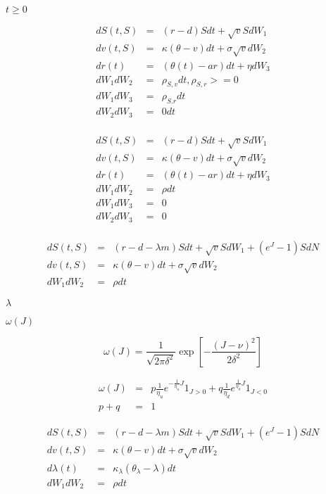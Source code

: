 \documentclass{article}
\begin{document}
$ t \geq 0 $
\pagebreak

\[\begin{array}{rcl}
dS(t, S)  &=& (r-d) S dt +\sqrt{v} S dW_1 \\
dv(t, S)  &=& \kappa (\theta - v) dt + \sigma \sqrt{v} dW_2 \\
dr(t)     &=& (\theta(t) - a r) dt + \eta dW_3 \\
dW_1 dW_2 &=& \rho_{S,v} dt, \rho_{S,r} >= 0 \\
dW_1 dW_3 &=& \rho_{S.r} dt \\
dW_2 dW_3 &=& 0 dt \\
\end{array}
\]
\pagebreak

\[\begin{array}{rcl}
dS(t, S)  &=& (r-d) S dt +\sqrt{v} S dW_1 \\
dv(t, S)  &=& \kappa (\theta - v) dt + \sigma \sqrt{v} dW_2 \\
dr(t)     &=& (\theta(t) - a r) dt + \eta dW_3 \\
dW_1 dW_2 &=& \rho dt \\
dW_1 dW_3 &=& 0 \\
dW_2 dW_3 &=& 0 \\
\end{array}
\]
\pagebreak

\[\begin{array}{rcl}
dS(t, S)  &=& (r-d-\lambda m) S dt +\sqrt{v} S dW_1 + (e^J - 1) S dN \\
dv(t, S)  &=& \kappa (\theta - v) dt + \sigma \sqrt{v} dW_2 \\
dW_1 dW_2 &=& \rho dt
\end{array}
\]
\pagebreak

$ \lambda
$
\pagebreak

$ \omega(J) $
\pagebreak

\[\omega(J) = \frac{1}{\sqrt{2\pi \delta^2}}
            \exp\left[-\frac{(J-\nu)^2}{2\delta^2}\right]
\]
\pagebreak

\[\begin{array}{rcl}
\omega(J)&=&  p\frac{1}{\eta_u}e^{-\frac{1}{\eta_u}J} 1_{J>0}
            + q\frac{1}{\eta_d}e^{\frac{1}{\eta_d}J} 1_{J<0} \\
p + q &=& 1
\end{array}
\]
\pagebreak

\[\begin{array}{rcl}
dS(t, S)  &=& (r-d-\lambda m) S dt +\sqrt{v} S dW_1 + (e^J - 1) S dN \\
dv(t, S)  &=& \kappa (\theta - v) dt + \sigma \sqrt{v} dW_2 \\
d\lambda(t) &=& \kappa_\lambda(\theta_\lambda-\lambda) dt \\
dW_1 dW_2 &=& \rho dt
\end{array}
\]
\pagebreak
\end{document}
